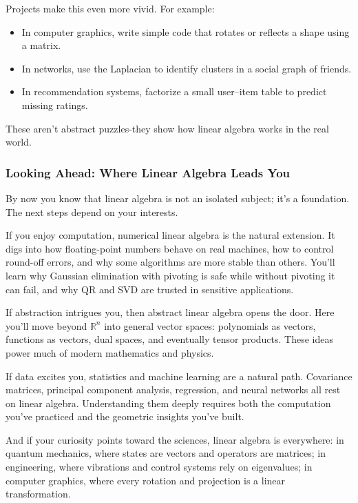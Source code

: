 \documentclass[
  letterpaper,
  DIV=11,
  numbers=noendperiod]{scrreprt}
\providecommand{\tightlist}{%
  \setlength{\itemsep}{0pt}\setlength{\parskip}{0pt}}
\begin{document}
Projects make this even more vivid. For example:

\begin{itemize}
\tightlist
\item
  In computer graphics, write simple code that rotates or reflects a
  shape using a matrix.
\item
  In networks, use the Laplacian to identify clusters in a social graph
  of friends.
\item
  In recommendation systems, factorize a small user--item table to
  predict missing ratings.
\end{itemize}

These aren't abstract puzzles-they show how linear algebra works in the
real world.

\subsubsection{Looking Ahead: Where Linear Algebra Leads
You}\label{looking-ahead-where-linear-algebra-leads-you}

By now you know that linear algebra is not an isolated subject; it's a
foundation. The next steps depend on your interests.

If you enjoy computation, numerical linear algebra is the natural
extension. It digs into how floating-point numbers behave on real
machines, how to control round-off errors, and why some algorithms are
more stable than others. You'll learn why Gaussian elimination with
pivoting is safe while without pivoting it can fail, and why QR and SVD
are trusted in sensitive applications.

If abstraction intrigues you, then abstract linear algebra opens the
door. Here you'll move beyond \(\mathbb{R}^n\) into general vector
spaces: polynomials as vectors, functions as vectors, dual spaces, and
eventually tensor products. These ideas power much of modern mathematics
and physics.

If data excites you, statistics and machine learning are a natural path.
Covariance matrices, principal component analysis, regression, and
neural networks all rest on linear algebra. Understanding them deeply
requires both the computation you've practiced and the geometric
insights you've built.

And if your curiosity points toward the sciences, linear algebra is
everywhere: in quantum mechanics, where states are vectors and operators
are matrices; in engineering, where vibrations and control systems rely
on eigenvalues; in computer graphics, where every rotation and
projection is a linear transformation.
\end{document}
